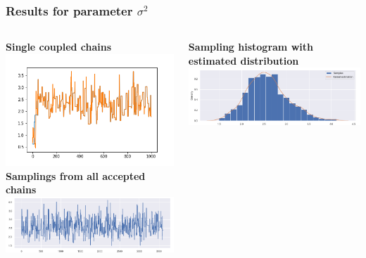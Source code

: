 \documentclass{beamer}
\begin{document}
\begin{frame}
	\frametitle{Results for parameter $\sigma^2$}
	
	\vspace{2mm}
	\begin{columns}
		
		\begin{column}{0.49\textwidth}
			\centering
			{\scriptsize \textbf{Single coupled chains}}\\
			\vspace{-2mm}
			\includegraphics[width=0.85\columnwidth]{doublecoupling_chainmeeting/doublecoupling_sigma_chain_meeting}
			\vspace{0.2cm}
			{	\scriptsize \textbf{Samplings from all accepted chains }}\\
			\includegraphics[width=\columnwidth]{doublecoupling_pack/doublecoupling_sampling_sigma}
		\end{column}
		\begin{column}{0.49\textwidth}
			\centering
			{\scriptsize \textbf{Sampling histogram with estimated distribution}}\\
			\vspace{3mm}
			\includegraphics[width=1\columnwidth]{doublecoupling_pack/doublecoupling_sigma_histogram_kernel}
		\end{column}
	\end{columns}
	

\end{frame}
\end{document}

